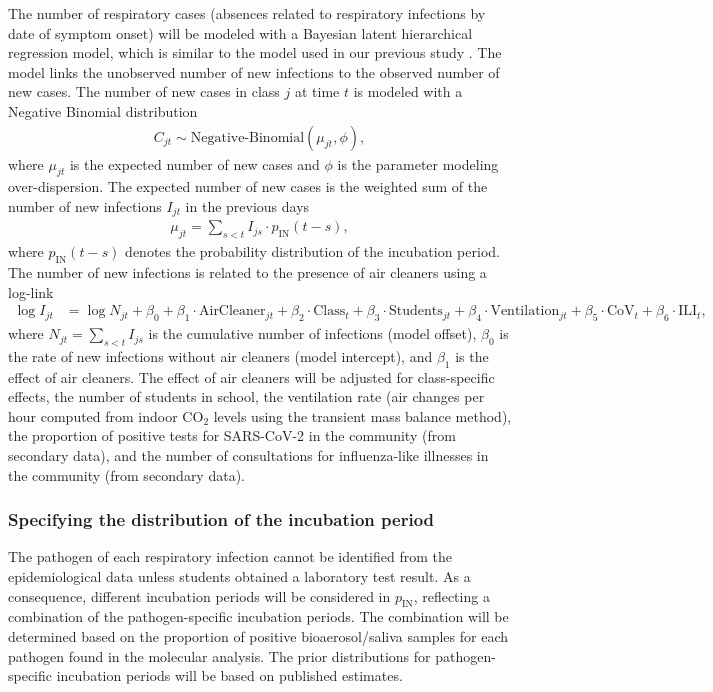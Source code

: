 \documentclass{article}
\begin{document}
The number of respiratory cases (absences related to respiratory infections by date of symptom onset) will be modeled with a Bayesian latent hierarchical regression model, which is similar to the model used in our previous study . The model links the unobserved number of new infections to the observed number of new cases. The number of new cases in class $j$ at time $t$ is modeled with a Negative Binomial distribution   
\begin{align*}
    C_{jt} \sim \text{Negative-Binomial}(\mu_{jt},\phi),
\end{align*}
where $\mu_{jt}$ is the expected number of new cases and $\phi$ is the parameter modeling over-dispersion. The expected number of new cases is the weighted sum of the number of new infections $I_{jt}$ in the  previous days
\begin{align*}
    \mu_{jt} = \sum_{s<t}I_{js} \cdot p_{\text{IN}}(t-s),
\end{align*}
where $p_{\text{IN}}(t-s)$ denotes the probability distribution of the incubation period. The  number of new infections is related to the presence of air cleaners using a log-link
\begin{align*}
    \log I_{jt} &= \log N_{jt} + \beta_0 + \beta_1 \cdot \text{AirCleaner}_{jt} + \beta_2 \cdot \text{Class}_t + \beta_3 \cdot \text{Students}_{jt} + \beta_4 \cdot \text{Ventilation}_{jt} + \beta_5 \cdot \text{CoV}_t + \beta_6 \cdot \text{ILI}_t,
\end{align*}
where $N_{jt} = \sum_{s<t} I_{js}$ is the cumulative number of infections (model offset), $\beta_0$ is the rate of new infections without air cleaners (model intercept), and $\beta_1$ is the effect of air cleaners. The effect of air cleaners will be adjusted for class-specific effects, the number of students in school, the ventilation rate (air changes per hour computed from indoor CO$_2$ levels using the transient mass balance method\cite{Battermann2017}), the proportion of positive tests for SARS-CoV-2 in the community (from secondary data), and the number of consultations for influenza-like illnesses in the community (from secondary data). 

\subsubsection*{Specifying the distribution of the incubation period}

The pathogen of each respiratory infection cannot be identified from the epidemiological data unless students obtained a laboratory test result. As a consequence, different incubation periods will be considered in $p_{\text{IN}}$, reflecting a combination of the pathogen-specific incubation periods. The combination will be determined based on the proportion of positive bioaerosol/saliva samples for each pathogen found in the molecular analysis. The prior distributions for pathogen-specific incubation periods will be based on published estimates. 
\end{document}
